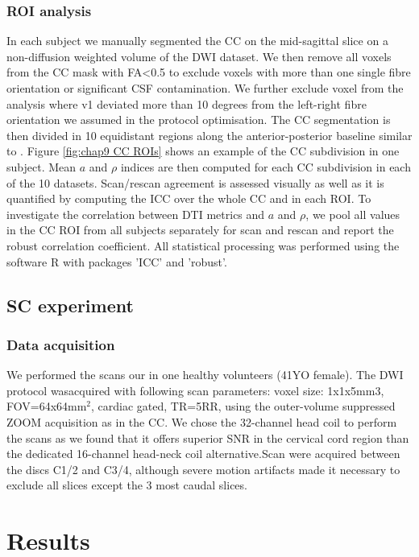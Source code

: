 \subsubsection*{ROI analysis} 
In each subject we manually segmented the CC on the mid-sagittal slice on a non-diffusion weighted volume of the \gls{DWI} dataset. We then remove all voxels from the CC mask with FA<0.5 to exclude voxels with more than one single fibre orientation or significant CSF contamination. We further exclude voxel from the analysis where v1 deviated more than 10 degrees from the left-right fibre orientation we assumed in the protocol optimisation. The CC segmentation is then divided in 10 equidistant regions along the anterior-posterior baseline similar to \cite{Aboitiz:1992}. Figure \ref{fig:chap9 CC ROIs} shows an example of the CC subdivision in one subject. Mean $a$ and $\rho$ indices are then computed for each CC subdivision in each of the 10 datasets. Scan/rescan agreement is assessed visually as well as it is quantified by computing the \gls{ICC} \citep{Shrout:1979} over the whole CC and in each \gls{ROI}. To investigate the correlation between DTI metrics and $a$ and $\rho$, we pool all values in the CC ROI from all subjects separately for scan and rescan and report the robust correlation coefficient\citep{Huber:1996}. All statistical processing was performed using the software R\citep{RCoreTeam:2012} with packages 'ICC'\citep{Wolak:2011} and 'robust'\citep{Wang:2012}.

\subsection{SC experiment}
\subsubsection*{Data acquisition}
We performed the scans  our \SFasym{} in one healthy volunteers (41YO female). The \SF{} DWI protocol wasacquired with following scan parameters: voxel size: 1x1x5mm3, FOV=64x64mm$^2$, cardiac gated, TR=5RR, using the outer-volume suppressed ZOOM acquisition \citep{Wilm:2007} as in the CC. We chose the 32-channel head coil to perform the scans as we found that it offers superior SNR in the cervical cord region than the dedicated 16-channel head-neck coil alternative.Scan were acquired between the discs C1/2 and C3/4, although severe motion artifacts made it necessary to exclude all slices except the 3 most caudal slices. 

\FloatBarrier
\section{Results}
